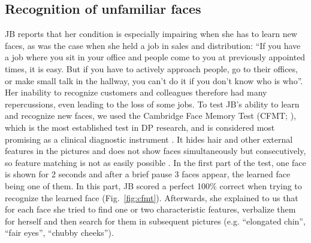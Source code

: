 \documentclass[fleqn,10pt]{SelfArx} %
\begin{document}
\subsection*{Recognition of unfamiliar faces}

JB reports that her condition is especially impairing when she has to learn new faces, as was the case when she held a job in sales and distribution: “If you have a job where you sit in your office and people come to you at previously appointed times, it is easy. But if you have to actively approach people, go to their offices, or make small talk in the hallway, you can't do it if you don't know who is who”. Her inability to recognize customers and colleagues therefore had many repercussions, even leading to the loss of some jobs.
To test JB's ability to learn and recognize new faces, we used the Cambridge Face Memory Test (CFMT; \citet{Duchaine_2006cfmt}), which is the most established test in DP research, and is considered most promising as a clinical diagnostic instrument \citep{Susilo_2013, Towler_2017}. It hides hair and other external features in the pictures and does not show faces simultaneously but consecutively, so feature matching is not as easily possible \citep{Duchaine_2006cfmt}. In the first part of the test, one face is shown for 2 seconds and after a brief pause 3 faces appear, the learned face being one of them. In this part, JB scored a perfect 100\% correct when trying to recognize the learned face (Fig.~\ref{fig:cfmt}). Afterwards, she explained to us that for each face she tried to find one or two characteristic features, verbalize them for herself and then search for them in subsequent pictures (e.g. “elongated chin”, “fair eyes”, “chubby cheeks”).
\end{document}

